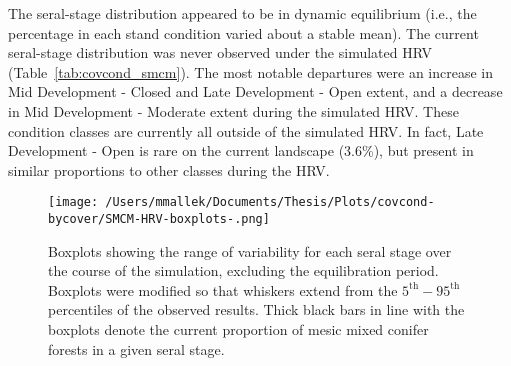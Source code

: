 The seral-stage distribution appeared to be in dynamic equilibrium (i.e., the percentage in each stand condition varied about a stable mean). The current seral-stage distribution was never observed under the simulated HRV (Table~\ref{tab:covcond_smcm}). The most notable departures were an increase in Mid Development - Closed and Late Development - Open extent, and a decrease in Mid Development - Moderate extent during the simulated HRV. These condition classes are currently all outside of the simulated HRV. In fact, Late Development - Open is rare on the current landscape (3.6\%), but present in similar proportions to  other classes during the HRV. 



\begin{figure}[!htbp]
  \centering
    \texttt{[image: /Users/mmallek/Documents/Thesis/Plots/covcond-bycover/SMCM-HRV-boxplots-.png]}
  \caption{Boxplots showing the range of variability for each seral stage over the course of the simulation, excluding the equilibration period. Boxplots were modified so that whiskers extend from the $5^{\text{th}} - 95^{\text{th}}$ percentiles of the observed results. Thick black bars in line with the boxplots denote the current proportion of mesic mixed conifer forests in a given seral stage.} 
  \label{fig:covcond_smcm_boxplots}
\end{figure}


